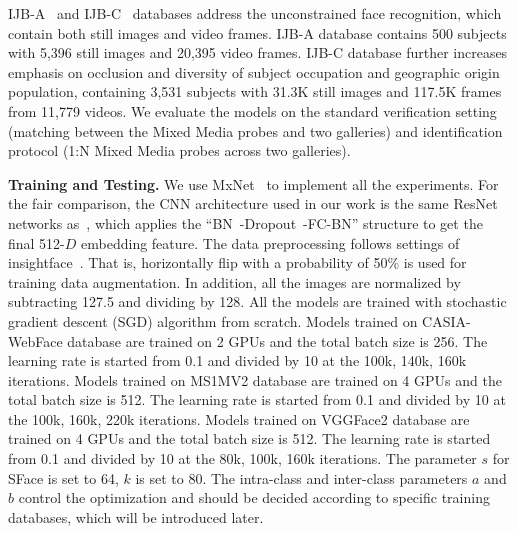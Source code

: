 \documentclass[journal,comsoc]{IEEEtran}
\begin{document}
IJB-A~\cite{klare2015pushing} and IJB-C~\cite{maze2018iarpa} databases address the unconstrained face recognition, which contain both still images and video frames. IJB-A database contains 500 subjects with 5,396 still images and 20,395 video frames. IJB-C database further increases emphasis on occlusion and diversity of subject occupation and geographic origin population, containing 3,531 subjects with 31.3K still images and 117.5K frames from 11,779 videos. We evaluate the models on the standard verification setting (matching between the Mixed Media probes and two galleries) and identification protocol (1:N Mixed Media probes across two galleries).

\textbf{Training and Testing.} We use MxNet~\cite{Chen2015MXNet} to implement all the experiments. For the fair comparison, the CNN architecture used in our work is the same ResNet~\cite{he2016deep} networks as~\cite{deng2019arcface}, which applies the ``BN~\cite{ioffe2015batch}-Dropout~\cite{Srivastava2014Dropout}-FC-BN'' structure to get the final 512-$D$ embedding feature. The data preprocessing follows settings of insightface~\cite{deng2019arcface}. That is, horizontally flip with a probability of 50\% is used for training data augmentation. In addition, all the images are normalized by subtracting 127.5 and dividing by 128. All the models are trained with stochastic gradient descent (SGD) algorithm from scratch. Models trained on CASIA-WebFace database are trained on 2 GPUs and the total batch size is 256. The learning rate is started from 0.1 and divided by 10 at the 100k, 140k, 160k iterations. Models trained on MS1MV2 database are trained on 4 GPUs and the total batch size is 512. The learning rate is started from 0.1 and divided by 10 at the 100k, 160k, 220k iterations. Models trained on VGGFace2 database are trained on 4 GPUs and the total batch size is 512. The learning rate is started from 0.1 and divided by 10 at the 80k, 100k, 160k iterations. The parameter $s$ for SFace is set to 64, $k$ is set to 80. The intra-class and inter-class parameters $a$ and $b$ control the optimization and should be decided according to specific training databases, which will be introduced later.
\end{document}

